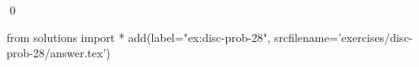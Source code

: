 
\begin{ex} 
  \label{ex:disc-prob-28}
  
  \qed
\end{ex} 
\begin{python0}
from solutions import *
add(label="ex:disc-prob-28",
    srcfilename='exercises/disc-prob-28/answer.tex') 
\end{python0}
